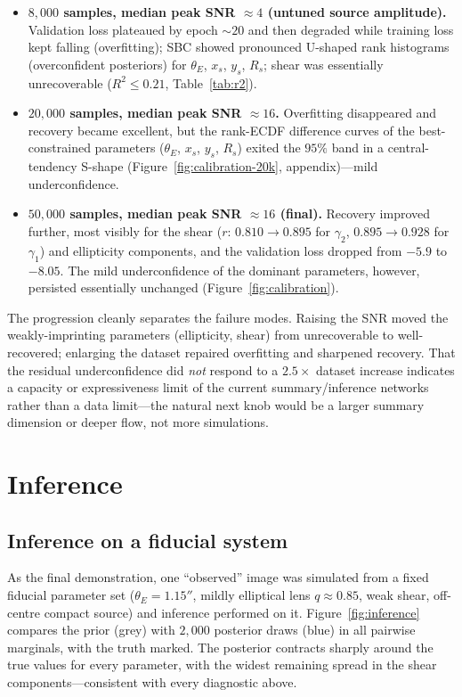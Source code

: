 \documentclass[11pt,a4paper]{article}
\newcommand{\valLossFinal}{-8.05}\newcommand{\valLossFinalK}{-6.79}
\begin{document}
\begin{itemize}
    \item \textbf{$8{,}000$ samples, median peak SNR $\approx 4$ (untuned source
    amplitude).} Validation loss plateaued by epoch ${\sim}20$ and then degraded
    while training loss kept falling (overfitting); SBC showed pronounced U-shaped
    rank histograms (overconfident posteriors) for $\theta_E$, $x_s$, $y_s$,
    $R_s$; shear was essentially unrecoverable ($R^2 \leq 0.21$,
    Table~\ref{tab:r2}).
    \item \textbf{$20{,}000$ samples, median peak SNR $\approx 16$.} Overfitting
    disappeared and recovery became excellent, but the rank-ECDF difference curves
    of the best-constrained parameters ($\theta_E$, $x_s$, $y_s$, $R_s$) exited
    the $95\%$ band in a central-tendency S-shape
    (Figure~\ref{fig:calibration-20k}, appendix)---mild underconfidence.
    \item \textbf{$50{,}000$ samples, median peak SNR $\approx 16$ (final).}
    Recovery improved further, most visibly for the shear
    ($r$: $0.810 \to 0.895$ for $\gamma_2$, $0.895 \to 0.928$ for $\gamma_1$) and
    ellipticity components, and the validation loss dropped from $-5.9$ to
    $\valLossFinal$. The mild underconfidence of the dominant parameters,
    however, persisted essentially unchanged (Figure~\ref{fig:calibration}).
\end{itemize}

The progression cleanly separates the failure modes. Raising the SNR moved the
weakly-imprinting parameters (ellipticity, shear) from unrecoverable to
well-recovered; enlarging the dataset repaired overfitting and sharpened
recovery. That the residual underconfidence did \emph{not} respond to a
$2.5\times$ dataset increase indicates a capacity or expressiveness limit of the
current summary/inference networks rather than a data limit---the natural next
knob would be a larger summary dimension or deeper flow, not more simulations.

\section{Inference}

\subsection{Inference on a fiducial system}

As the final demonstration, one ``observed'' image was simulated from a fixed
fiducial parameter set ($\theta_E = 1.15''$, mildly elliptical lens $q \approx
0.85$, weak shear, off-centre compact source) and inference performed on it.
Figure~\ref{fig:inference} compares the prior (grey) with $2{,}000$ posterior
draws (blue) in all pairwise marginals, with the truth marked. The posterior
contracts sharply around the true values for every parameter, with the widest
remaining spread in the shear components---consistent with every diagnostic above.
\end{document}
